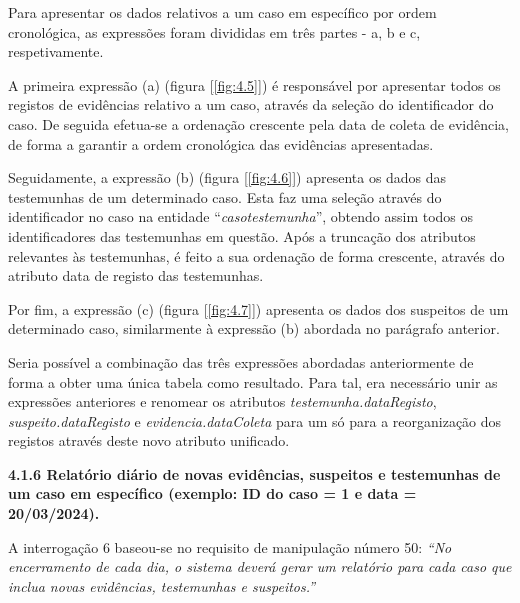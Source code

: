 \documentclass[a4paper,12pt]{scrreprt}
\begin{document}
Para apresentar os dados relativos a um caso em específico por ordem cronológica, as expressões foram divididas em três partes - a, b e c, respetivamente.

A primeira expressão (a) (figura [\ref{fig:4.5}]) é responsável por apresentar todos os registos de evidências relativo a um caso, através da seleção do identificador do caso. De seguida efetua-se a ordenação crescente pela data de coleta de evidência, de forma a garantir a ordem cronológica das evidências apresentadas.

Seguidamente, a expressão (b) (figura [\ref{fig:4.6}]) apresenta os dados das testemunhas de um determinado caso. Esta faz uma seleção através do identificador no caso na entidade “\textit{casotestemunha}”, obtendo assim todos os identificadores das testemunhas em questão. Após a truncação dos atributos relevantes às testemunhas, é feito a sua ordenação de forma crescente, através do atributo data de registo das testemunhas.

Por fim, a expressão (c) (figura [\ref{fig:4.7}]) apresenta os dados dos suspeitos de um determinado caso, similarmente à expressão (b) abordada no parágrafo anterior.

Seria possível a combinação das três expressões abordadas anteriormente de forma a obter uma única tabela como resultado. Para tal, era necessário unir as expressões anteriores e renomear os atributos \textit{testemunha.dataRegisto}, \textit{suspeito.dataRegisto} e \textit{evidencia.dataColeta} para um só para a reorganização dos registos através deste novo atributo unificado.

\clearpage %

{\large\textbf{4.1.6 Relatório diário de novas evidências, suspeitos e testemunhas de um caso em específico (exemplo: ID do caso = 1 e data = 20/03/2024).}}

\vspace{0.2cm}

A interrogação 6 baseou-se no requisito de manipulação número 50: \textit{“No encerramento de cada dia, o sistema deverá gerar um relatório para cada caso que inclua novas evidências, testemunhas e suspeitos.”}

\vspace{0.2cm}
\end{document}

